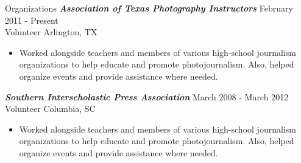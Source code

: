 \begin{section}{Organizations}
  {\textsl \textbf{Association of Texas Photography Instructors}} \hfill February 2011 - Present \\
  Volunteer \hfill Arlington, TX
  \begin{itemize}
  \item
    Worked alongside teachers and members of various high-school journalism organizations to help educate and promote photojournalism. Also, helped organize events and provide assistance where needed.
  \end{itemize}

  {\textsl \textbf{Southern Interscholastic Press Association}} \hfill  March 2008 - March 2012 \\
  Volunteer \hfill Columbia, SC
  \begin{itemize}
  \item
    Worked alongside teachers and members of various high-school journalism organizations to help educate and promote photojournalism. Also, helped organize events and provide assistance where needed.
  \end{itemize}
\end{section}
